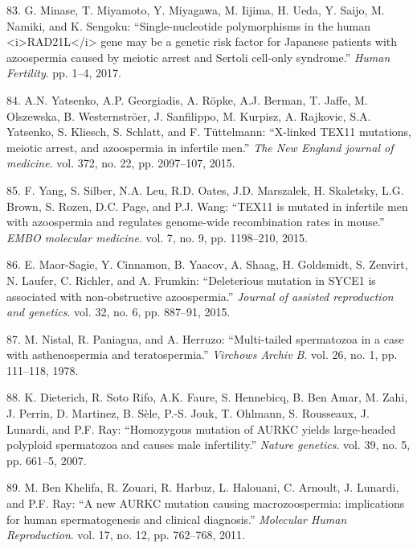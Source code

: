 \documentclass[12pt,a4paper,twoside]{ugathesis}
\theoremstyle{definition}
\theoremstyle{definition}
\theoremstyle{definition}
\theoremstyle{remark}
\begin{document}
\hypertarget{ref-Minase2017}{}
83. G. Minase, T. Miyamoto, Y. Miyagawa, M. Iijima, H. Ueda, Y. Saijo,
M. Namiki, and K. Sengoku: ``Single-nucleotide polymorphisms in the
human \textless{}i\textgreater{}RAD21L\textless{}/i\textgreater{} gene
may be a genetic risk factor for Japanese patients with azoospermia
caused by meiotic arrest and Sertoli cell-only syndrome.'' \emph{Human
Fertility}. pp. 1--4, 2017.

\hypertarget{ref-Yatsenko2015}{}
84. A.N. Yatsenko, A.P. Georgiadis, A. Röpke, A.J. Berman, T. Jaffe, M.
Olszewska, B. Westernströer, J. Sanfilippo, M. Kurpisz, A. Rajkovic,
S.A. Yatsenko, S. Kliesch, S. Schlatt, and F. Tüttelmann: ``X-linked
TEX11 mutations, meiotic arrest, and azoospermia in infertile men.''
\emph{The New England journal of medicine}. vol. 372, no. 22, pp.
2097--107, 2015.

\hypertarget{ref-Yang2015}{}
85. F. Yang, S. Silber, N.A. Leu, R.D. Oates, J.D. Marszalek, H.
Skaletsky, L.G. Brown, S. Rozen, D.C. Page, and P.J. Wang: ``TEX11 is
mutated in infertile men with azoospermia and regulates genome-wide
recombination rates in mouse.'' \emph{EMBO molecular medicine}. vol. 7,
no. 9, pp. 1198--210, 2015.

\hypertarget{ref-Maor-Sagie2015}{}
86. E. Maor-Sagie, Y. Cinnamon, B. Yaacov, A. Shaag, H. Goldsmidt, S.
Zenvirt, N. Laufer, C. Richler, and A. Frumkin: ``Deleterious mutation
in SYCE1 is associated with non-obstructive azoospermia.'' \emph{Journal
of assisted reproduction and genetics}. vol. 32, no. 6, pp. 887--91,
2015.

\hypertarget{ref-Nistal}{}
87. M. Nistal, R. Paniagua, and A. Herruzo: ``Multi-tailed spermatozoa
in a case with asthenospermia and teratospermia.'' \emph{Virchows Archiv
B}. vol. 26, no. 1, pp. 111--118, 1978.

\hypertarget{ref-Dieterich2007}{}
88. K. Dieterich, R. Soto Rifo, A.K. Faure, S. Hennebicq, B. Ben Amar,
M. Zahi, J. Perrin, D. Martinez, B. Sèle, P.-S. Jouk, T. Ohlmann, S.
Rousseaux, J. Lunardi, and P.F. Ray: ``Homozygous mutation of AURKC
yields large-headed polyploid spermatozoa and causes male infertility.''
\emph{Nature genetics}. vol. 39, no. 5, pp. 661--5, 2007.

\hypertarget{ref-BenKhelifa2011}{}
89. M. Ben Khelifa, R. Zouari, R. Harbuz, L. Halouani, C. Arnoult, J.
Lunardi, and P.F. Ray: ``A new AURKC mutation causing macrozoospermia:
implications for human spermatogenesis and clinical diagnosis.''
\emph{Molecular Human Reproduction}. vol. 17, no. 12, pp. 762--768,
2011.
\end{document}
